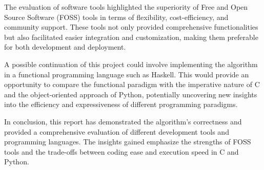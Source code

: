 \documentclass[a4paper,12pt]{article}
\begin{document}
The evaluation of software tools highlighted the superiority of Free and Open Source Software (FOSS) tools in terms of flexibility, cost-efficiency, and community support. These tools not only provided comprehensive functionalities but also facilitated easier integration and customization, making them preferable for both development and deployment.

A possible continuation of this project could involve implementing the algorithm in a functional programming language such as Haskell. This would provide an opportunity to compare the functional paradigm with the imperative nature of C and the object-oriented approach of Python, potentially uncovering new insights into the efficiency and expressiveness of different programming paradigms.

In conclusion, this report has demonstrated the algorithm's correctness and provided a comprehensive evaluation of different development tools and programming languages. The insights gained emphasize the strengths of FOSS tools and the trade-offs between coding ease and execution speed in C and Python.
\end{document}
